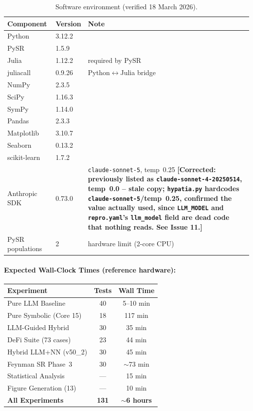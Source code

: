 \documentclass[twoside,11pt]{article}
\begin{document}
\begin{table}[H]
\centering
\caption{Software environment (verified 18 March 2026).}
\label{tab:runtime_reproducibility}
\small
\begin{tabular}{@{}lll@{}}
\toprule
\textbf{Component} & \textbf{Version} & \textbf{Note} \\
\midrule
Python       & 3.12.2  & \\
PySR         & 1.5.9   & \\
Julia        & 1.12.2  & required by PySR \\
juliacall    & 0.9.26  & Python$\leftrightarrow$Julia bridge \\
NumPy        & 2.3.5   & \\
SciPy        & 1.16.3  & \\
SymPy        & 1.14.0  & \\
Pandas       & 2.3.3   & \\
Matplotlib   & 3.10.7  & \\
Seaborn      & 0.13.2  & \\
scikit-learn & 1.7.2   & \\
Anthropic SDK & 0.73.0 & \texttt{claude-sonnet-5}, temp~0.25 \textbf{[Corrected:
  previously listed as \texttt{claude-sonnet-4-20250514}, temp~0.0 --
  stale copy; \texttt{hypatia.py} hardcodes \texttt{claude-sonnet-5}/temp~0.25,
  confirmed the value actually used, since \texttt{LLM\_MODEL} and
  \texttt{repro.yaml}'s \texttt{llm\_model} field are dead code that
  nothing reads. See Issue 11.]} \\
\midrule
PySR populations & 2 & hardware limit (2-core CPU) \\
\bottomrule
\end{tabular}
\end{table}

\paragraph{Expected Wall-Clock Times (reference hardware):}
\begin{small}
\begin{tabular}{@{}lcc@{}}
\toprule
\textbf{Experiment} & \textbf{Tests} & \textbf{Wall Time} \\
\midrule
Pure LLM Baseline          & 40  & 5--10 min \\
Pure Symbolic (Core 15)    & 18  & 117 min \\
LLM-Guided Hybrid          & 30  & 35 min \\
DeFi Suite (73 cases)      & 23  & 44 min \\
Hybrid LLM+NN (v50\_2)     & 30  & 45 min \\
Feynman SR Phase~3         & 30  & $\sim$73 min \\
Statistical Analysis       & --- & 15 min \\
Figure Generation (13)     & --- & 10 min \\
\midrule
\textbf{All Experiments}   & \textbf{131} & \textbf{$\sim$6 hours} \\
\bottomrule
\end{tabular}
\end{small}
\end{document}

